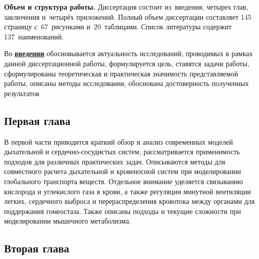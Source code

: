 \textbf{Объем и структура работы.} Диссертация состоит из~введения, четырех глав, заключения и~четырёх приложений. Полный объем диссертации составляет 145 страницу с~67~рисунками и~20~таблицами. Список литературы содержит 137~наименований.

Во \underline{\textbf{введении}} обосновывается актуальность исследований, проводимых в рамках данной диссертационной работы,  формулируется цель, ставятся задачи работы, сформулированы теоретическая и практическая значимость представляемой работы, описаны методы исследования, обоснована достоверность полученных результатов 

\subsection*{Первая глава}

В первой части приводится краткий обзор и анализ современных моделей дыхательной и сердечно-сосудистых систем, рассматривается применимость подходов для различных практических задач. Описываются методы для совместного расчета дыхательной и кровеносной систем при моделировании глобального транспорта веществ. Отдельное внимание уделяется связыванию кислорода и углекислого газа в крови, а также регуляции минутной вентиляции легких, сердечного выброса и перераспределения кровотока между органами для поддержания гомеостаза. Также описаны подходы и текущие сложности при моделировании мышечного метаболизма. 
\subsection*{Вторая глава}

